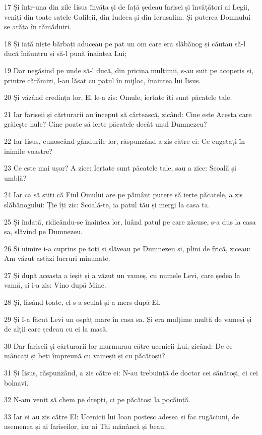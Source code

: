 \par 17 Și într-una din zile Iisus învăța și de față ședeau farisei și învățători ai Legii, veniți din toate satele Galileii, din Iudeea și din Ierusalim. Și puterea Domnului se arăta în tămăduiri.
\par 18 Și iată niște bărbați aduceau pe pat un om care era slăbănog și căutau să-l ducă înăuntru și să-l pună înaintea Lui;
\par 19 Dar negăsind pe unde să-l ducă, din pricina mulțimii, s-au suit pe acoperiș și, printre cărămizi, l-au lăsat cu patul în mijloc, înaintea lui Iisus.
\par 20 Și văzând credința lor, El le-a zis: Omule, iertate îți sunt păcatele tale.
\par 21 Iar fariseii și cărturarii au început să cârtească, zicând: Cine este Acesta care grăiește hule? Cine poate să ierte păcatele decât unul Dumnezeu?
\par 22 Iar Iisus, cunoscând gândurile lor, răspunzând a zis către ei: Ce cugetați în inimile voastre?
\par 23 Ce este mai ușor? A zice: Iertate sunt păcatele tale, sau a zice: Scoală și umblă?
\par 24 Iar ca să știți că Fiul Omului are pe pământ putere să ierte păcatele, a zis slăbănogului: Ție îți zic: Scoală-te, ia patul tău și mergi la casa ta.
\par 25 Și îndată, ridicându-se înaintea lor, luând patul pe care zăcuse, s-a dus la casa sa, slăvind pe Dumnezeu.
\par 26 Și uimire i-a cuprins pe toți și slăveau pe Dumnezeu și, plini de frică, ziceau: Am văzut astăzi lucruri minunate.
\par 27 Și după aceasta a ieșit și a văzut un vameș, cu numele Levi, care ședea la vamă, și i-a zis: Vino după Mine.
\par 28 Și, lăsând toate, el s-a sculat și a mers după El.
\par 29 Și I-a făcut Levi un ospăț mare în casa sa. Și era mulțime multă de vameși și de alții care ședeau cu ei la masă.
\par 30 Dar fariseii și cărturarii lor murmurau către ucenicii Lui, zicând: De ce mâncați și beți împreună cu vameșii și cu păcătoșii?
\par 31 Și Iisus, răspunzând, a zis către ei: N-au trebuință de doctor cei sănătoși, ci cei bolnavi.
\par 32 N-am venit să chem pe drepți, ci pe păcătoși la pocăință.
\par 33 Iar ei au zis către El: Ucenicii lui Ioan postesc adesea și fac rugăciuni, de asemenea și ai fariseilor, iar ai Tăi mănâncă și beau.
